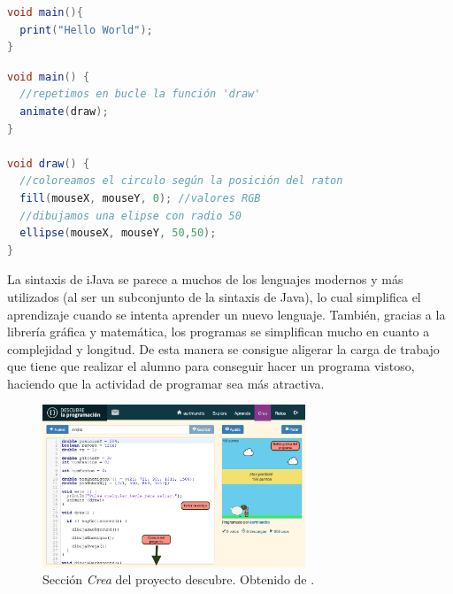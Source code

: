 \begin{lstlisting}[language={Java}, label={code:hello-world}, caption={Programa básico en iJava imprimiendo la cadena "Hello World".}]
void main(){
  print("Hello World");
}
\end{lstlisting}


\begin{lstlisting}[language={Java},label={code:circulos-color-raton}, caption={Programa en iJava que dibuja un circulo de un color diferente según la posición en la pantalla en la que se encuentra el ratón.}]
void main() {
  //repetimos en bucle la función 'draw'
  animate(draw);
}

void draw() {
  //coloreamos el circulo según la posición del raton
  fill(mouseX, mouseY, 0); //valores RGB
  //dibujamos una elipse con radio 50
  ellipse(mouseX, mouseY, 50,50);
}
\end{lstlisting}


La sintaxis de iJava se parece a muchos de los lenguajes modernos y más utilizados (al ser un subconjunto de la sintaxis de Java), lo cual simplifica el aprendizaje cuando se intenta aprender un nuevo lenguaje. También, gracias a la librería gráfica y matemática, los programas se simplifican mucho en cuanto a complejidad y longitud. De esta manera se consigue aligerar la carga de trabajo que tiene que realizar el alumno para conseguir hacer un programa vistoso, haciendo que la actividad de programar sea más atractiva.


\begin{figure}[!ht]
	\begin{centering}
		\includegraphics[width=0.7\textwidth]{images/descubre-crea.png}
				\caption{Sección \emph{Crea} del proyecto \Gls{descubre}. Obtenido de \cite{descubre}.}
				\label{fig:descubre-crea}
	\end{centering}
\end{figure}



